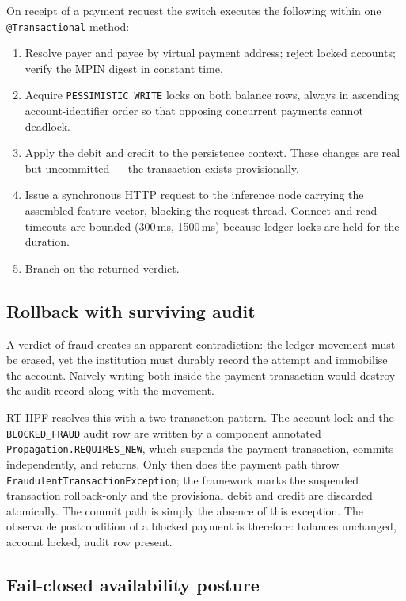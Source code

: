 \documentclass[journal]{IEEEtran}
\begin{document}
On receipt of a payment request the switch executes the following within one
\texttt{@Transactional} method:

\begin{enumerate}
\item Resolve payer and payee by virtual payment address; reject locked
accounts; verify the MPIN digest in constant time.
\item Acquire \texttt{PESSIMISTIC\_WRITE} locks on both balance rows, always
in ascending account-identifier order so that opposing concurrent payments
cannot deadlock.
\item Apply the debit and credit to the persistence context. These changes
are real but uncommitted --- the transaction exists provisionally.
\item Issue a synchronous HTTP request to the inference node carrying the
assembled feature vector, blocking the request thread. Connect and read
timeouts are bounded (300\,ms, 1500\,ms) because ledger locks are held for
the duration.
\item Branch on the returned verdict.
\end{enumerate}

\subsection{Rollback with surviving audit}

A verdict of fraud creates an apparent contradiction: the ledger movement
must be erased, yet the institution must durably record the attempt and
immobilise the account. Naively writing both inside the payment transaction
would destroy the audit record along with the movement.

RT-IIPF resolves this with a two-transaction pattern. The account lock and
the \texttt{BLOCKED\_FRAUD} audit row are written by a component annotated
\texttt{Propagation.REQUIRES\_NEW}, which suspends the payment transaction,
commits independently, and returns. Only then does the payment path throw
\texttt{FraudulentTransactionException}; the framework marks the suspended
transaction rollback-only and the provisional debit and credit are discarded
atomically. The commit path is simply the absence of this exception. The
observable postcondition of a blocked payment is therefore: balances
unchanged, account locked, audit row present.

\subsection{Fail-closed availability posture}
\end{document}
